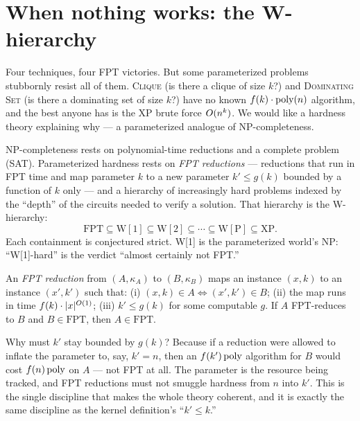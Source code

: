 \section{When nothing works: the W-hierarchy}

Four techniques, four FPT victories. But some parameterized problems stubbornly resist all of them. \textsc{Clique} (is there a clique of size $k$?) and \textsc{Dominating Set} (is there a dominating set of size $k$?) have no known $f(k)\cdot\operatorname{poly}(n)$ algorithm, and the best anyone has is the XP brute force $O(n^k)$. We would like a hardness theory explaining why --- a parameterized analogue of NP-completeness.

\begin{intuitionbox}
NP-completeness rests on polynomial-time reductions and a complete problem (SAT). Parameterized hardness rests on \emph{FPT reductions} --- reductions that run in FPT time and map parameter $k$ to a new parameter $k'\le g(k)$ bounded by a function of $k$ only --- and a hierarchy of increasingly hard problems indexed by the ``depth'' of the circuits needed to verify a solution. That hierarchy is the W-hierarchy:
\[
  \mathrm{FPT}\subseteq \mathrm{W[1]}\subseteq \mathrm{W[2]}\subseteq\cdots\subseteq \mathrm{W[P]}\subseteq \mathrm{XP}.
\]
Each containment is conjectured strict. W[1] is the parameterized world's NP: ``W[1]-hard'' is the verdict ``almost certainly not FPT.''
\end{intuitionbox}

\begin{definition}\label{ch25:def-fptred}
An \emph{FPT reduction} from $(A,\kappa_A)$ to $(B,\kappa_B)$ maps an instance $(x,k)$ to an instance $(x',k')$ such that: (i) $(x,k)\in A \iff (x',k')\in B$; (ii) the map runs in time $f(k)\cdot\lvert x\rvert^{O(1)}$; (iii) $k'\le g(k)$ for some computable $g$. If $A$ FPT-reduces to $B$ and $B\in\mathrm{FPT}$, then $A\in\mathrm{FPT}$.
\end{definition}

\begin{whybox}
Why must $k'$ stay bounded by $g(k)$? Because if a reduction were allowed to inflate the parameter to, say, $k'=n$, then an $f(k')\operatorname{poly}$ algorithm for $B$ would cost $f(n)\operatorname{poly}$ on $A$ --- not FPT at all. The parameter is the resource being tracked, and FPT reductions must not smuggle hardness from $n$ into $k'$. This is the single discipline that makes the whole theory coherent, and it is exactly the same discipline as the kernel definition's ``$k'\le k$.''
\end{whybox}

